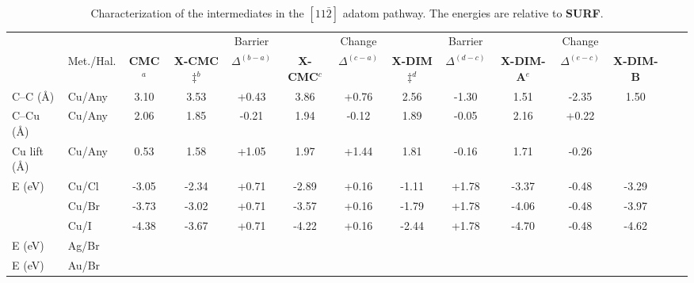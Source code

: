 \documentclass[journal=jacsat,manuscript=article]{achemso}
\begin{document}
\begin{table}
\centering
\caption{Characterization of the intermediates in the $[11\bar{2}]$ adatom pathway. %
The energies are relative to \textbf{SURF}. 
}
\label{table:adatom-longitude}
\begin{tabular}{ llcccccccccccc  }
 \hline
 \hline
  & & & & Barrier & & Change & & Barrier & &Change&\\
  & Met./Hal. & \textbf{CMC}$^{a}$ & \textbf{X-CMC$\ddagger$}$^{b}$ & $\Delta^{(b-a)}$ & \textbf{X-CMC}$^{c}$ &$\Delta^{(c-a)}$ & \textbf{X-DIM$\ddagger$}$^{d}$ & $\Delta^{(d-c)}$ & \textbf{X-DIM-A}$^{e}$ &$\Delta^{(e-c)}$ & \textbf{X-DIM-B}  \\ 
 \hline
 \hline 
 {C--C (\si{\angstrom})} & Cu/Any & {3.10} & {3.53} & {+0.43} & {3.86} &{+0.76} & {2.56} & {-1.30} & {1.51} &{-2.35} &{1.50}\\ 
 \hline
 {C--Cu (\si{\angstrom}) } & Cu/Any & {2.06} & {1.85} & {-0.21} & {1.94} &{-0.12} & {1.89} & {-0.05} & {2.16} &{+0.22} & \\ 
 \hline
 {Cu lift (\si{\angstrom}) } & Cu/Any & {0.53} & {1.58} & {+1.05} & {1.97} &{+1.44} & {1.81} & {-0.16} & {1.71} &{-0.26} & \\ 
 \hline
 \multirow{3}{*}{E (\si{\electronvolt}) } & Cu/Cl & -3.05 &-2.34 & +0.71 &-2.89 &+0.16 &-1.11 & +1.78 & -3.37&-0.48&-3.29\\ 
 & Cu/Br &-3.73 &-3.02 &+0.71 & -3.57 &+0.16 &-1.79 & +1.78 & -4.06 & -0.48&-3.97 \\ 
 & Cu/I  & -4.38 & -3.67 & +0.71 & -4.22 &+0.16 &-2.44 & +1.78 & -4.70 & -0.48&-4.62\\ 
 \hline
 E (\si{\electronvolt}) & Ag/Br & & & & & & & & & & \\ 
 E (\si{\electronvolt}) & Au/Br & & & & & & & & & & \\
  \hline
 \hline
\end{tabular}
\end{table}

\end{document}
